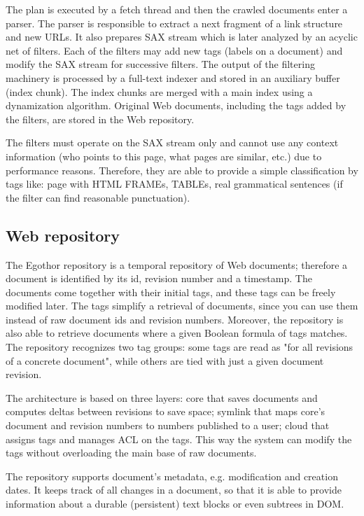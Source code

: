 \documentclass{sig-alternate}
\begin{document}
The plan is executed by a fetch thread and then the crawled documents enter a parser. The parser is responsible to extract a next fragment of a link structure and new URLs. It also prepares SAX stream which is later analyzed by an acyclic net of filters. Each of the filters may add new tags (labels on a document) and modify the SAX stream for successive filters. The output of the filtering machinery is processed by a full-text indexer and stored in an auxiliary buffer (index chunk).  The index chunks are merged with a main index using a dynamization algorithm. Original Web documents, including the tags added by the filters, are stored in the Web repository.

The filters must operate on the SAX stream only and cannot use any context information (who points to this page, what pages are similar, etc.) due to performance reasons. Therefore, they are able to provide a simple classification by tags like: page with HTML FRAMEs, TABLEs, real grammatical sentences (if the filter can find reasonable punctuation).


\subsection{Web repository}
The Egothor repository is a temporal repository of Web documents; therefore a document is identified by its id, revision number and a timestamp. The documents come together with their initial tags, and these tags can be freely modified later. The tags simplify a retrieval of documents, since you can use them instead of raw document ids and revision numbers. Moreover, the repository is also able to retrieve documents where a given Boolean formula of tags matches. The repository recognizes two tag groups: some tags are read as "for all revisions of a concrete document", while others are tied with just a given document revision.

The architecture is based on three layers: core that saves documents and computes deltas between revisions to save space; symlink that maps core's document and revision numbers to numbers published to a user; cloud that assigns tags and manages ACL on the tags. This way the system can modify the tags without overloading the main base of raw documents.

The repository supports document's metadata, e.g. modification and creation dates. It keeps track of all changes in a document, so that it is able to provide information about a durable (persistent) text blocks or even subtrees in DOM.
\end{document}

